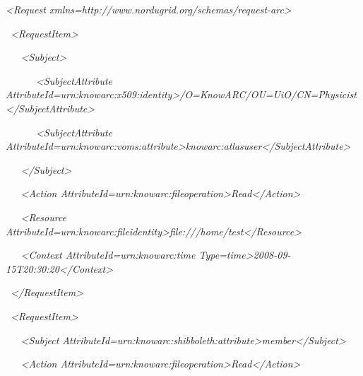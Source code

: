 \documentclass{article}
\begin{document}
{\itshape\color{black}
{\textless}Request
xmlns={\textquotedbl}http://www.nordugrid.org/schemas/request-arc{\textquotedbl}{\textgreater}}

{\color{black}
\textit{\ }\textit{{\textless}RequestItem{\textgreater}}}

{\color{black}
\textit{\ \ \ }\textit{{\textless}Subject{\textgreater}}}

{\color{black}
\textit{\ \ \ \ \ \ }\textit{{\textless}SubjectAttribute
AttributeId={\textquotedbl}urn:knowarc:x509:identity{\textquotedbl}{\textgreater}/O=KnowARC/OU=UiO/CN=Physicist{\textless}/SubjectAttribute{\textgreater}}}

{\color{black}
\textit{\ \ \ \ \ \ }\textit{{\textless}SubjectAttribute
AttributeId={\textquotedbl}urn:knowarc:voms:attribute{\textgreater}knowarc:atlasuser{\textless}/SubjectAttribute{\textgreater}}}

{\color{black}
\textit{\ \ \ }\textit{{\textless}/Subject{\textgreater}}}

{\color{black}
\textit{\ \ \ }\textit{{\textless}Action
AttributeId={\textquotedbl}urn:knowarc:fileoperation{\textquotedbl}{\textgreater}Read{\textless}/Action{\textgreater}}}

{\color{black}
\textit{\ \ \ }\textit{{\textless}Resource
AttributeId={\textquotedbl}urn:knowarc:fileidentity{\textgreater}file:///home/test{\textless}/Resource{\textgreater}}}

{\color{black}
\textit{\ \ \ }\textit{{\textless}Context
AttributeId={\textquotedbl}urn:knowarc:time{\textquotedbl}
Type={\textquotedbl}time{\textquotedbl}{\textgreater}2008-09-15T20:30:20{\textless}/Context{\textgreater}}}

{\color{black}
\textit{\ }\textit{{\textless}/RequestItem{\textgreater}}}

{\color{black}
\textit{\ }\textit{{\textless}RequestItem{\textgreater}}}

{\color{black}
\textit{\ \ \ }\textit{{\textless}Subject
AttributeId={\textquotedbl}urn:knowarc:shibboleth:attribute{\textquotedbl}{\textgreater}member{\textless}/Subject{\textgreater}}}

{\color{black}
\textit{\ \ \ }\textit{{\textless}Action
AttributeId={\textquotedbl}urn:knowarc:fileoperation{\textquotedbl}{\textgreater}Read{\textless}/Action{\textgreater}}}
\end{document}
